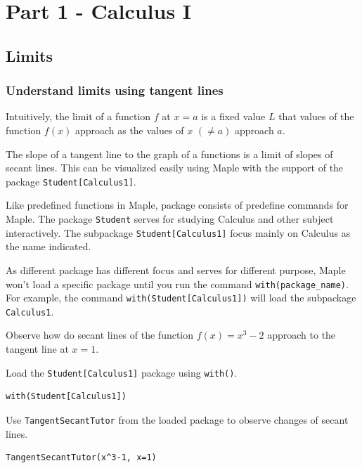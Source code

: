\documentclass[
  en,11pt,simple]{elegantbook}
\renewenvironment{example}[1][]{
  \refstepcounter{exam}
  \par\noindent\textbf{\color{main}{\examplename} \theexam #1}
  \rmfamily
}{
  \par\ignorespacesafterend
}
\begin{document}
\hypertarget{part-part-1---calculus-i}{%
\part*{Part 1 - Calculus I}\label{part-part-1---calculus-i}}

\hypertarget{limits}{%
\chapter{Limits}\label{limits}}

\hypertarget{understand-limits-using-tangent-lines}{%
\section{Understand limits using tangent lines}\label{understand-limits-using-tangent-lines}}

Intuitively, the limit of a function \(f\) at \(x=a\) is a fixed value \(L\) that values of the function \(f(x)\) approach as the values of \(x\) \((\ne a)\) approach \(a\).

The slope of a tangent line to the graph of a functions is a limit of slopes of secant lines. This can be visualized easily using Maple with the support of the package \texttt{Student{[}Calculus1{]}}.

Like predefined functions in Maple, package consists of predefine commands for Maple. The package \texttt{Student} serves for studying Calculus and other subject interactively. The subpackage \texttt{Student{[}Calculus1{]}} focus mainly on Calculus as the name indicated.

As different package has different focus and serves for different purpose, Maple won't load a specific package until you run the command \texttt{with(package\_name)}. For example, the command
\texttt{with(Student{[}Calculus1{]})} will load the subpackage \texttt{Calculus1}.

\begin{example}

Observe how do secant lines of the function \(f(x)=x^3-2\) approach to the tangent line at \(x=1\).
\end{example}

\begin{solution}
{}Load the \texttt{Student{[}Calculus1{]}} package using \texttt{with()}.

\begin{verbatim}
with(Student[Calculus1])
\end{verbatim}

Use \texttt{TangentSecantTutor} from the loaded package to observe changes of secant lines.

\begin{verbatim}
TangentSecantTutor(x^3-1, x=1)
\end{verbatim}
\end{solution}
\end{document}
